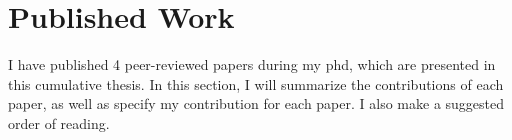 
\chapter{Published Work}
I have published 4 peer-reviewed papers during my phd, which are presented in this cumulative thesis. In this section, I will summarize the contributions of each paper, as well as specify my contribution for each paper. I also make a suggested order of reading.